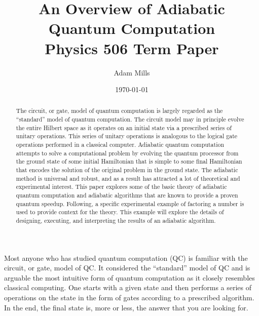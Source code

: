 \documentclass[%
 reprint,
 amsmath,amssymb,
 aps,
]{revtex4-1}
\begin{document}

\title{An Overview of Adiabatic Quantum Computation \\ Physics 506 Term Paper}%

\author{Adam Mills}

\date{\today}%

\begin{abstract}
	The circuit, or gate, model of quantum computation is largely regarded as the ``standard'' model of quantum computation. The circuit model may in principle evolve the entire Hilbert space as it operates on an initial state via a prescribed series of unitary operations. This series of unitary operations is analogous to the logical gate operations performed in a classical computer. Adiabatic quantum computation attempts to solve a computational problem by evolving the quantum processor from the ground state of some initial Hamiltonian that is simple to some final Hamiltonian that encodes the solution of the original problem in the ground state. The adiabatic method is universal and robust, and as a result has attracted a lot of theoretical and experimental interest. This paper explores some of the basic theory of adiabatic quantum computation and adiabatic algorithms that are known to provide a proven quantum speedup. Following, a specific experimental example of factoring a number is used to provide context for the theory. This example will explore the details of designing, executing, and interpreting the results of an adiabatic algorithm.
\end{abstract}

\maketitle



   Most anyone who has studied quantum computation (QC) is familiar with the circuit, or gate, model of QC\cite{Deutsch73}. It considered the ``standard'' model of QC and is arguable the most intuitive form of quantum computation as it closely resembles classical computing. One starts with a given state and then performs a series of operations on the state in the form of gates according to a prescribed algorithm. In the end, the final state is, more or less, the answer that you are looking for. 
\end{document}

